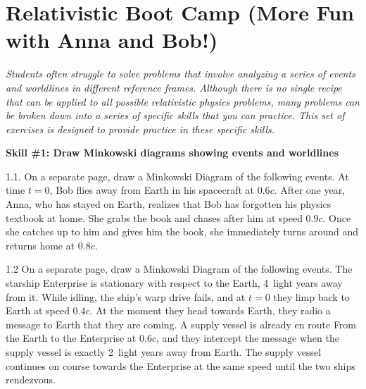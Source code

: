 \section{Relativistic Boot Camp (More Fun with Anna and Bob!)}

\makelabheader %

\bigskip

\textit{Students often struggle to solve problems that involve analyzing a series of events and worldlines in different reference frames.  Although there is no single recipe that can be applied to all possible relativistic physics problems, many problems can be broken down into a series of specific skills that you can practice.  This set of exercises is designed to provide practice in these specific skills.}

\textbf{Skill \#1: Draw Minkowski diagrams showing events and worldlines}

1.1. On a separate page, draw a Minkowski Diagram of the following events.  At time $t=0$, Bob flies away from Earth in his spacecraft at $0.6 c$.  After one year, Anna, who has stayed on Earth, realizes that Bob has forgotten his physics textbook at home.  She grabs the book and chases after him at speed $0.9 c$.  Once she catches up to him and gives him the book, she immediately turns around and returns home at $0.8 c$.  
\bigskip

1.2 On a separate page, draw a Minkowski Diagram of the following events.  The starship Enterprise is stationary with respect to the Earth, 4~light years away from it.  While idling, the ship's warp drive fails, and at $t=0$ they limp back to Earth at speed $0.4 c$.  At the moment they head towards Earth, they radio a message to Earth that they are coming.  A supply vessel is already en route From the Earth to the Enterprise at $0.6 c$, and they intercept the message when the supply vessel is exactly 2~light years away from Earth.  The supply vessel continues on course towards the Enterprise at the same speed until the two ships rendezvous.  
\bigskip

